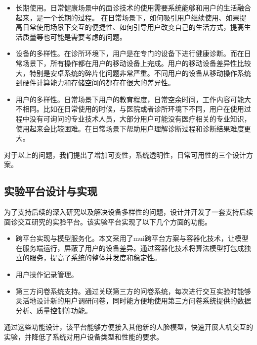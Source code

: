 \begin{itemize}
    
    \item 长期使用。日常健康场景中的面诊技术的使用需要系统能够和用户的生活融合起来，是一个长期的过程。 在日常场景下，如何吸引用户继续使用、如果提高日常使用场景下交互的便捷性、如何引导用户改变自己的生活方式，提高生活质量等也可能是需要考虑的问题。

    \item 设备的多样性。在诊所环境下，用户是在专门的设备下进行健康诊断。而在日常场景下，所有操作都在用户的移动设备上完成。用户的移动设备差异性比较大，特别是安卓系统的碎片化问题非常严重。不同用户的设备从移动操作系统到硬件计算能力和存储空间的都存在很大的差异性。
    
    \item 用户的多样性。日常场景下用户的教育程度，日常空余时间，工作内容可能大不相同。比如在日常使用的时候，与医院或者诊所环境下不同，用户在使用过程中没有可询问的专业技术人员，大部分用户可能没有医疗相关的专业知识，使用起来会比较困难。在日常场景下帮助用户理解诊断过程和诊断结果难度更大。

\end{itemize}

对于以上的问题，我们提出了增加可变性，系统透明性，日常可用性的三个设计方案。

\subsection{实验平台设计与实现}

为了支持后续的深入研究以及解决设备多样性的问题，设计并开发了一套支持后续面诊交互研究的实验平台。该实验平台实现了以下几个方面的功能。

\begin{itemize}

    \item 跨平台实现与模型服务化。本文采用了mui跨平台方案与容器化技术，让模型在服务端运行，屏蔽了用户的设备差异。通过容器化技术将算法模型打包成独立的服务，提高了系统的整体并发度和稳定性。

    \item 用户操作记录管理。

    \item 第三方问卷系统支持。通过关联第三方的问卷系统，每次进行交互实验时能够灵活地设计新的用户调研问卷，同时能方便地使用第三方问卷系统提供的数据分析、质量控制等功能。

\end{itemize}

通过这些功能设计，该平台能够方便接入其他新的人脸模型，快速开展人机交互的实验，并降低了系统对用户设备类型和性能的要求。


